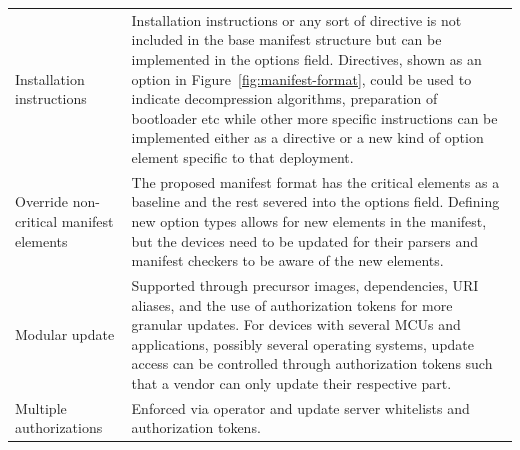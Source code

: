 \documentclass[0-thesis.tex]{subfiles}
\begin{document}
\begin{longtable}[]{@{}ll@{}}
    \begin{minipage}[t]{0.41\columnwidth}\raggedright\strut Installation
    instructions\strut \end{minipage} &
    \begin{minipage}[t]{0.53\columnwidth}\raggedright\strut Installation instructions or
    any sort of directive is not included in the base manifest structure but can be
    implemented in the options field. Directives, shown as an option in
    Figure~\ref{fig:manifest-format}, could be used to indicate decompression algorithms,
    preparation of bootloader etc while other more specific instructions can be
    implemented either as a directive or a new kind of option element specific to that
    deployment.\strut \end{minipage}\tabularnewline
    \begin{minipage}[t]{0.41\columnwidth}\raggedright\strut
    Override non-critical manifest elements\strut
    \end{minipage} & \begin{minipage}[t]{0.53\columnwidth}\raggedright\strut
    The proposed manifest format has the critical elements as a baseline and
    the rest severed into the options field. Defining new option types
    allows for new elements in the manifest, but the devices need to be
    updated for their parsers and manifest checkers to be aware of the new
    elements.\strut
    \end{minipage}\tabularnewline
    \begin{minipage}[t]{0.41\columnwidth}\raggedright\strut
    Modular update\strut
    \end{minipage} & \begin{minipage}[t]{0.53\columnwidth}\raggedright\strut
    Supported through precursor images, dependencies, URI aliases, and the
    use of authorization tokens for more granular updates. For devices with
    several MCUs and applications, possibly several operating systems,
    update access can be controlled through authorization tokens such that a
    vendor can only update their respective part.\strut
    \end{minipage}\tabularnewline
    \begin{minipage}[t]{0.41\columnwidth}\raggedright\strut
    Multiple authorizations\strut
    \end{minipage} & \begin{minipage}[t]{0.53\columnwidth}\raggedright\strut
    Enforced via operator and update server whitelists and authorization
    tokens.\strut

\end{minipage}
\end{longtable}
\end{document}

